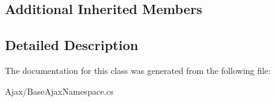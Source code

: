 \subsection*{Additional Inherited Members}


\subsection{Detailed Description}


The documentation for this class was generated from the following file\+:\begin{DoxyCompactItemize}
\item 
Ajax/Base\+Ajax\+Namespace.\+cs\end{DoxyCompactItemize}

